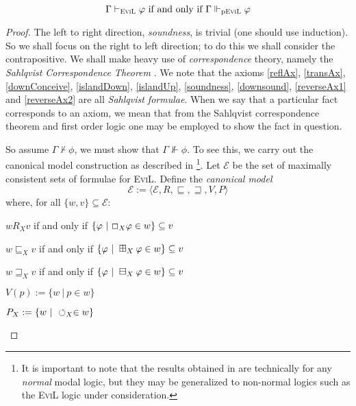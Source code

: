 \begin{theorem}\label{partly-evil-completeness}

$$\Gamma \vdash_{\textsc{EviL}} \phi\textup{ if and only if }\Gamma
\Vdash_{\textup{p\textsc{EviL}}} \phi$$

\end{theorem}
\begin{proof}
The left to right direction, \emph{soundness}, is trivial (one should
use induction).  So we shall focus on the right to left direction; 
to do this we shall consider the contrapositive.  We shall make heavy
use of \emph{correspondence} theory, namely the \emph{Sahlqvist
  Correspondence Theorem} \cite[Theorem 4.42,
pg. 212]{blackburn_modal_2001}.  We note that the axioms
\eqref{reflAx}, \eqref{transAx}, \eqref{downConceive}, \eqref{islandDown},
\eqref{islandUp}, \eqref{soundness}, \eqref{downsound},
\eqref{reverseAx1} and
\eqref{reverseAx2} are all
\emph{Sahlqvist formulae}.  When we say that a particular fact corresponds to an
axiom, we mean that from the Sahlqvist correspondence theorem and
first order logic one may be employed to show the fact in question.

So assume $\Gamma \nvdash \phi$, 
we must show that $\Gamma \nVdash \phi$.  
To see this, we carry out the canonical model construction as
described in \cite[chapter 4,
pgs. 198--422]{blackburn_modal_2001}\footnote{It is important to note
  that the results obtained in \cite{blackburn_modal_2001} are technically for any \emph{normal} modal logic,
  but they may be generalized to non-normal logics such as the
  \textsc{EviL} logic under consideration.}.  Let $\mathcal{E}$ be the set of maximally
  consistent sets of formulae for \textsc{EviL}. Define the
  \emph{canonical model}
  $$\mathscr{E} := 
\langle \mathcal{E}, R, \sqsubseteq, \sqsupseteq, V, P \rangle$$
where, for all $\{w,v\} \subseteq \mathcal{E}$:
\begin{bul}
  \item $w R_X v$ if and only if $\{ \phi\ |\ \Nec_X \phi \in w\}
    \subseteq v$
  \item $w \sqsubseteq_X v$ if and only if $\{ \phi\ |\ \BP_X \phi \in w\}
    \subseteq v$
  \item $w \sqsupseteq_X v$ if and only if $\{ \phi\ |\ \BM_X \phi \in w\}
    \subseteq v$
  \item $V(p) := \{ w \ |\ p \in w\}$
  \item $P_X := \{ w \ |\ \PP_X \in w \}$
\end{bul}


\end{proof}
